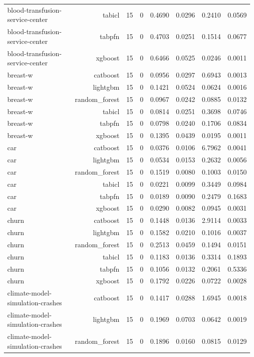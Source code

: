 \begin{table}[htbp]
\begin{tabular}{lrrrrrrr}
blood-transfusion-service-center & tabicl & 15 & 0 & 0.4690 & 0.0296 & 0.2410 & 0.0569 \\
blood-transfusion-service-center & tabpfn & 15 & 0 & 0.4703 & 0.0251 & 0.1514 & 0.0677 \\
blood-transfusion-service-center & xgboost & 15 & 0 & 0.6466 & 0.0525 & 0.0246 & 0.0011 \\
breast-w & catboost & 15 & 0 & 0.0956 & 0.0297 & 0.6943 & 0.0013 \\
breast-w & lightgbm & 15 & 0 & 0.1421 & 0.0524 & 0.0624 & 0.0016 \\
breast-w & random\_forest & 15 & 0 & 0.0967 & 0.0242 & 0.0885 & 0.0132 \\
breast-w & tabicl & 15 & 0 & 0.0814 & 0.0251 & 0.3698 & 0.0746 \\
breast-w & tabpfn & 15 & 0 & 0.0798 & 0.0240 & 0.1706 & 0.0834 \\
breast-w & xgboost & 15 & 0 & 0.1395 & 0.0439 & 0.0195 & 0.0011 \\
car & catboost & 15 & 0 & 0.0376 & 0.0106 & 6.7962 & 0.0041 \\
car & lightgbm & 15 & 0 & 0.0534 & 0.0153 & 0.2632 & 0.0056 \\
car & random\_forest & 15 & 0 & 0.1519 & 0.0080 & 0.1003 & 0.0150 \\
car & tabicl & 15 & 0 & 0.0221 & 0.0099 & 0.3449 & 0.0984 \\
car & tabpfn & 15 & 0 & 0.0189 & 0.0090 & 0.2479 & 0.1683 \\
car & xgboost & 15 & 0 & 0.0290 & 0.0082 & 0.0945 & 0.0031 \\
churn & catboost & 15 & 0 & 0.1448 & 0.0136 & 2.9114 & 0.0033 \\
churn & lightgbm & 15 & 0 & 0.1582 & 0.0210 & 0.1016 & 0.0037 \\
churn & random\_forest & 15 & 0 & 0.2513 & 0.0459 & 0.1494 & 0.0151 \\
churn & tabicl & 15 & 0 & 0.1183 & 0.0136 & 0.3314 & 0.1893 \\
churn & tabpfn & 15 & 0 & 0.1056 & 0.0132 & 0.2061 & 0.5336 \\
churn & xgboost & 15 & 0 & 0.1792 & 0.0226 & 0.0722 & 0.0028 \\
climate-model-simulation-crashes & catboost & 15 & 0 & 0.1417 & 0.0288 & 1.6945 & 0.0018 \\
climate-model-simulation-crashes & lightgbm & 15 & 0 & 0.1969 & 0.0703 & 0.0642 & 0.0019 \\
climate-model-simulation-crashes & random\_forest & 15 & 0 & 0.1896 & 0.0160 & 0.0815 & 0.0129 \\

\end{tabular}
\end{table}
